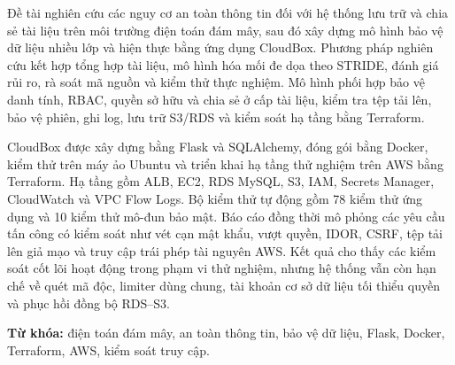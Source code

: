 \clearpage

Đề tài nghiên cứu các nguy cơ an toàn thông tin đối với hệ thống lưu trữ và chia sẻ tài liệu trên môi trường điện toán đám mây, sau đó xây dựng mô hình bảo vệ dữ liệu nhiều lớp và hiện thực bằng ứng dụng CloudBox. Phương pháp nghiên cứu kết hợp tổng hợp tài liệu, mô hình hóa mối đe dọa theo STRIDE, đánh giá rủi ro, rà soát mã nguồn và kiểm thử thực nghiệm. Mô hình phối hợp bảo vệ danh tính, RBAC, quyền sở hữu và chia sẻ ở cấp tài liệu, kiểm tra tệp tải lên, bảo vệ phiên, ghi log, lưu trữ S3/RDS và kiểm soát hạ tầng bằng Terraform.

CloudBox được xây dựng bằng Flask và SQLAlchemy, đóng gói bằng Docker, kiểm thử trên máy ảo Ubuntu và triển khai hạ tầng thử nghiệm trên AWS bằng Terraform. Hạ tầng gồm ALB, EC2, RDS MySQL, S3, IAM, Secrets Manager, CloudWatch và VPC Flow Logs. Bộ kiểm thử tự động gồm 78 kiểm thử ứng dụng và 10 kiểm thử mô-đun bảo mật. Báo cáo đồng thời mô phỏng các yêu cầu tấn công có kiểm soát như vét cạn mật khẩu, vượt quyền, IDOR, CSRF, tệp tải lên giả mạo và truy cập trái phép tài nguyên AWS. Kết quả cho thấy các kiểm soát cốt lõi hoạt động trong phạm vi thử nghiệm, nhưng hệ thống vẫn còn hạn chế về quét mã độc, limiter dùng chung, tài khoản cơ sở dữ liệu tối thiểu quyền và phục hồi đồng bộ RDS--S3.

\noindent\textbf{Từ khóa:} điện toán đám mây, an toàn thông tin, bảo vệ dữ liệu, Flask, Docker, Terraform, AWS, kiểm soát truy cập.

\clearpage

\tableofcontents


